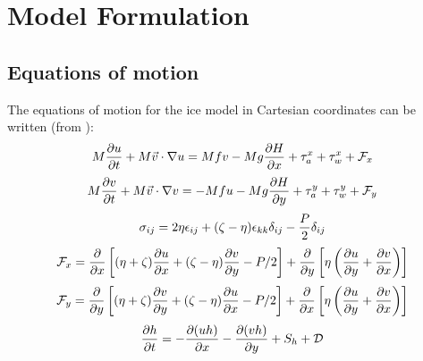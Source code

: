 \chapter{Model Formulation}
\label{Phys}
\section {Equations of motion}
The equations of motion for the ice model in Cartesian coordinates can
be written (from \cite{Hibler79}):
\begin{equation}
  M {\partial u \over \partial t} + M \vec{v} \cdot \nabla u = Mfv
  - Mg {\partial H \over \partial x} + \tau_a^x + \tau_w^x + {\cal F}_x
\label{st1}
\end{equation}
\vspace{.2cm}
\begin{equation}
  M {\partial v \over \partial t} + M \vec{v} \cdot \nabla v = - Mfu
  - Mg {\partial H \over \partial y} + \tau_a^y + \tau_w^y + {\cal F}_y
\label{st2}
\end{equation}
\vspace{.2cm}
\begin{equation}
  \sigma_{ij} = 2 \eta \epsilon_{ij} + (\zeta - \eta) \epsilon_{kk}
  \delta_{ij} - {P \over 2} \delta_{ij}
\label{stress1}
\end{equation}
\vspace{.2cm}
\begin{equation}
   {\cal F}_x = {\partial \over \partial x} \left[ (\eta + \zeta)
   {\partial u \over \partial x} + (\zeta - \eta)
   {\partial v \over \partial y} - P/2 \right] +
   {\partial \over \partial y} \left[ \eta \left( 
   {\partial u \over \partial y} + {\partial v \over \partial x}
   \right) \right]
\label{fx1}
\end{equation}
\vspace{.2cm}
\begin{equation}
   {\cal F}_y = {\partial \over \partial y} \left[ (\eta + \zeta)
   {\partial v \over \partial y} + (\zeta - \eta)
   {\partial u \over \partial x} - P/2 \right] +
   {\partial \over \partial x} \left[ \eta \left( 
   {\partial u \over \partial y} + {\partial v \over \partial x}
   \right) \right]
\label{fy1}
\end{equation}
\vspace{.2cm}
\begin{equation}
  {\partial h \over \partial t} =
  - {\partial (uh) \over \partial x} - {\partial (vh) \over \partial y}
  + S_h + {\cal D}
\label{st3a}
\end{equation}
